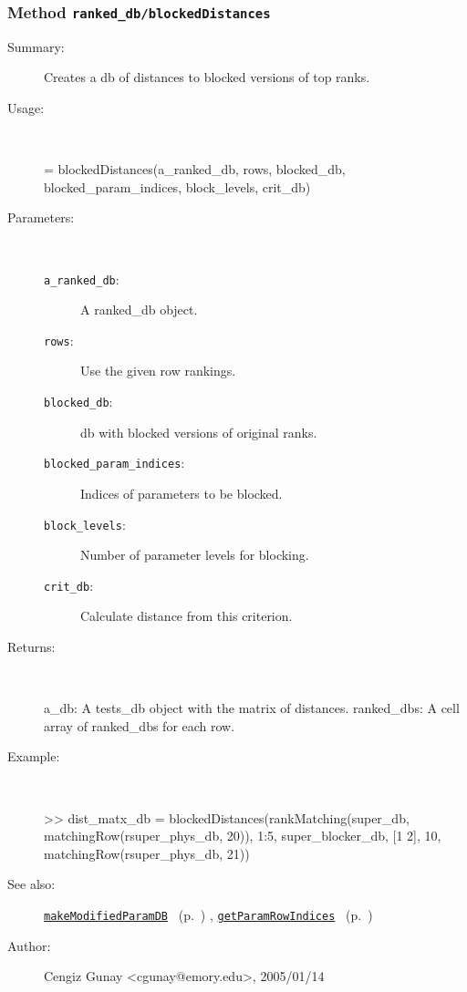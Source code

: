 \subsubsection[Method \texttt{blockedDistances}]{Method \texttt{ranked\_db/blockedDistances}}%
%
\label{ref_ranked_db__blockedDistances}%
\hypertarget{ref_ranked_db__blockedDistances}{}%
\begin{description}
\item[Summary:]Creates a db of distances to blocked versions of top ranks.
%
\item[Usage:]~%
\begin{lyxcode}%
[a\_db, ranked\_dbs] = 
   blockedDistances(a\_ranked\_db, rows, blocked\_db, blocked\_param\_indices, 
	  	     block\_levels, crit\_db)
%
\end{lyxcode}%
%
%
\item[Parameters:]~
\begin{description}%
\item[\texttt{a\_ranked\_db}:]
 A ranked\_db object.
\item[\texttt{rows}:]
 Use the given row rankings.
\item[\texttt{blocked\_db}:]
 db with blocked versions of original ranks.
\item[\texttt{blocked\_param\_indices}:]
 Indices of parameters to be blocked.
\item[\texttt{block\_levels}:]
 Number of parameter levels for blocking.
\item[\texttt{crit\_db}:]
 Calculate distance from this criterion.
\end{description}%
%
\item[Returns:
]~

	a\_db: A tests\_db object with the matrix of distances.
	ranked\_dbs: A cell array of ranked\_dbs for each row.
%
\item[Example:]~
\begin{lyxcode}        >> dist\_matx\_db = blockedDistances(rankMatching(super\_db, matchingRow(rsuper\_phys\_db, 20)), 1:5, super\_blocker\_db, [1 2], 10, matchingRow(rsuper\_phys\_db, 21))
\\%
\end{lyxcode}
%
\item[See also:]%
\hyperlink{ref_makeModifiedParamDB}{\texttt{makeModifiedParamDB}}%
\ (p.~\pageref{ref_makeModifiedParamDB})%
%
, \hyperlink{ref_getParamRowIndices}{\texttt{getParamRowIndices}}%
\ (p.~\pageref{ref_getParamRowIndices})%
%
%
\item[Author:]%
Cengiz Gunay <cgunay@emory.edu>, 2005/01/14
%
\end{description}
\methodline%
